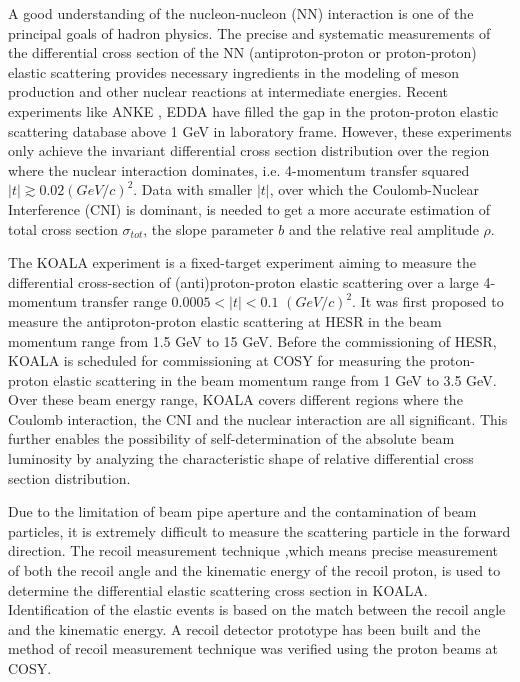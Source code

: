 \documentclass[number]{elsarticle}
\begin{document}
A good understanding of the nucleon-nucleon (NN) interaction is one of the principal goals of hadron physics.
The precise and systematic measurements of the differential cross section of the NN (antiproton-proton or proton-proton) elastic scattering provides necessary ingredients
in the modeling of meson production and other nuclear reactions at intermediate energies.
Recent experiments like ANKE \cite{ANKE}, EDDA \cite{EDDA} have filled the gap in the proton-proton elastic scattering database above 1 GeV in laboratory frame.
However, these experiments only achieve the invariant differential cross section distribution over the region where the nuclear interaction dominates, 
i.e. 4-momentum transfer squared \(|t| \gtrsim 0.02 (GeV/c)^2\).
Data with smaller \(|t|\), over which the Coulomb-Nuclear Interference (CNI) is dominant, is needed to get a more accurate estimation of total cross section \({\sigma}_{tot}\), the slope parameter \(b\) and the relative real amplitude \(\rho\).

The KOALA experiment is a fixed-target experiment aiming to measure the differential cross-section of (anti)proton-proton elastic scattering 
over a large 4-momentum transfer range \(0.0005 < |t| < 0.1\) \((GeV/c)^2\).
It was first proposed to measure the antiproton-proton elastic scattering at HESR in the beam momentum range from 1.5 GeV to 15 GeV.
Before the commissioning of HESR, KOALA is scheduled for commissioning at COSY for measuring the proton-proton elastic scattering in the beam momentum range from 1 GeV to 3.5 GeV.
Over these beam energy range, KOALA covers different regions where the Coulomb interaction, the CNI and the nuclear interaction are all significant.
This further enables the possibility of self-determination of the absolute beam luminosity by analyzing the characteristic shape of relative differential cross section distribution.

Due to the limitation of beam pipe aperture and the contamination of beam particles,
it is extremely difficult to measure the scattering particle in the forward direction.
The recoil measurement technique ,which means precise measurement of  both the recoil angle and the kinematic energy of the recoil proton, 
is used to determine the differential elastic scattering cross section in KOALA.
Identification of the elastic events is based on the match between the recoil angle and the kinematic energy.
A recoil detector prototype has been built and the method of recoil measurement technique was verified using the proton beams at COSY.
\end{document}
